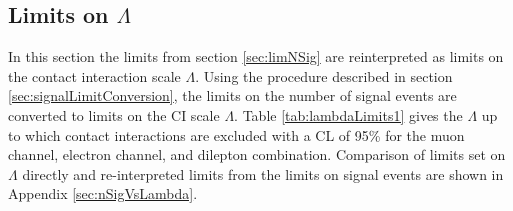

\subsection{Limits on $\Lambda$}
\label{sec:limLambda}

In this section the limits from section \ref{sec:limNSig} are reinterpreted as limits on the contact interaction scale $\Lambda$. Using the procedure described in section \ref{sec:signalLimitConversion}, the limits on the number of signal events are converted to limits on the CI scale $\Lambda$. Table \ref{tab:lambdaLimits1} gives the $\Lambda$ up to which contact interactions are excluded with a CL of 95\% for the muon channel, electron channel, and dilepton combination. Comparison of limits set on $\Lambda$ directly and re-interpreted limits from the limits on signal events are shown in Appendix \ref{sec:nSigVsLambda}.

